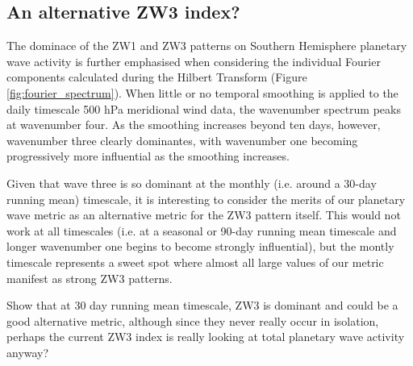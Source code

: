 \subsection{An alternative ZW3 index?}

The dominace of the ZW1 and ZW3 patterns on Southern Hemisphere planetary wave activity is further emphasised when considering the individual Fourier components calculated during the Hilbert Transform (Figure \ref{fig:fourier_spectrum}). When little or no temporal smoothing is applied to the daily timescale 500 hPa meridional wind data, the wavenumber spectrum peaks at wavenumber four. As the smoothing increases beyond ten days, however, wavenumber three clearly dominantes, with wavenumber one becoming progressively more influential as the smoothing increases.

Given that wave three is so dominant at the monthly (i.e. around a 30-day running mean) timescale, it is interesting to consider the merits of our planetary wave metric as an alternative metric for the ZW3 pattern itself. This would not work at all timescales (i.e. at a seasonal or 90-day running mean timescale and longer wavenumber one begins to become strongly influential), but the montly timescale represents a sweet spot where almost all large values of our metric manifest as strong ZW3 patterns. 


Show that at 30 day running mean timescale, ZW3 is dominant and could be a good alternative metric, although since they never really occur in isolation, perhaps the current ZW3 index is really looking at total planetary wave activity anyway?